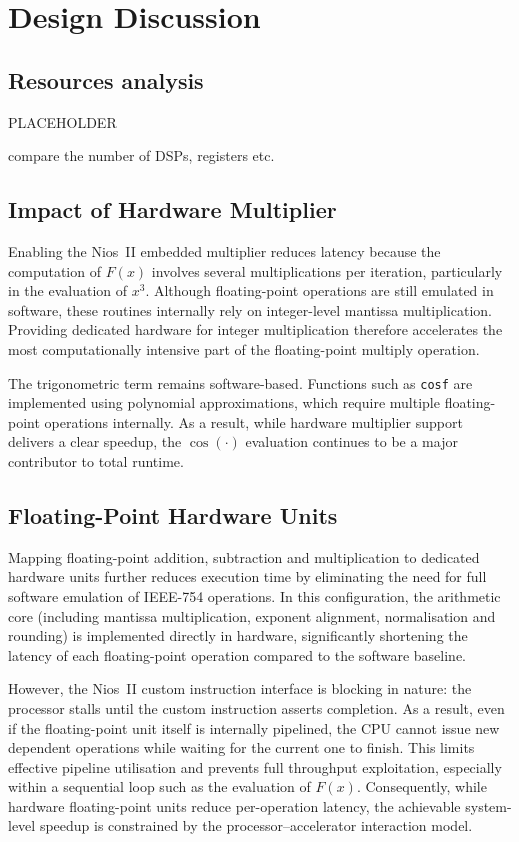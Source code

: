 \section{Design Discussion}

\subsection{Resources analysis}
PLACEHOLDER

compare the number of DSPs, registers etc.

\subsection{Impact of Hardware Multiplier}

Enabling the Nios~II embedded multiplier reduces latency because the computation of $F(x)$ involves several multiplications per iteration, particularly in the evaluation of $x^3$. 
Although floating-point operations are still emulated in software, these routines internally rely on integer-level mantissa multiplication. 
Providing dedicated hardware for integer multiplication therefore accelerates the most computationally intensive part of the floating-point multiply operation.

The trigonometric term remains software-based. 
Functions such as \texttt{cosf} are implemented using polynomial approximations, which require multiple floating-point operations internally. 
As a result, while hardware multiplier support delivers a clear speedup, the $\cos(\cdot)$ evaluation continues to be a major contributor to total runtime.


\subsection{Floating-Point Hardware Units}

Mapping floating-point addition, subtraction and multiplication to dedicated hardware units further reduces execution time by eliminating the need for full software emulation of IEEE-754 operations. 
In this configuration, the arithmetic core (including mantissa multiplication, exponent alignment, normalisation and rounding) is implemented directly in hardware, significantly shortening the latency of each floating-point operation compared to the software baseline.

However, the Nios~II custom instruction interface is blocking in nature: the processor stalls until the custom instruction asserts completion. 
As a result, even if the floating-point unit itself is internally pipelined, the CPU cannot issue new dependent operations while waiting for the current one to finish. 
This limits effective pipeline utilisation and prevents full throughput exploitation, especially within a sequential loop such as the evaluation of $F(x)$. 
Consequently, while hardware floating-point units reduce per-operation latency, the achievable system-level speedup is constrained by the processor--accelerator interaction model.
